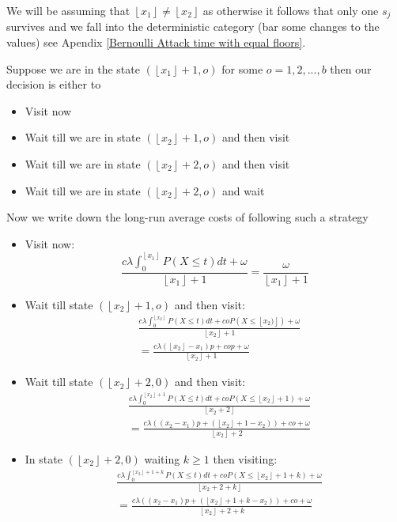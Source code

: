 \documentclass[a4paper,10pt]{article}
\newcommand{\floor}[1]{\left \lfloor #1 \right \rfloor}
\theoremstyle{definition}
\theoremstyle{definition}
\theoremstyle{remark}
\theoremstyle{definition}
\begin{document}
We will be assuming that $\floor{x_{1}} \neq \floor{x_{2}}$ as otherwise it follows that only one $s_{j}$ survives and we fall into the deterministic category (bar some changes to the values) see Apendix \ref{Bernoulli Attack time with equal floors}.

Suppose we are in the state $(\floor{x_{1}}+1,o)$ for some $o=1,2,...,b$ then our decision is either to
\begin{itemize}
\item Visit now
\item Wait till we are in state $(\floor{x_{2}}+1,o)$ and then visit
\item Wait till we are in state $(\floor{x_{2}}+2,o)$ and then visit
\item Wait till we are in state $(\floor{x_{2}}+2,o)$ and wait
\end{itemize}

Now we write down the long-run average costs of following such a strategy
\begin{itemize}
\item Visit now:
\begin{equation}
\frac{c \lambda \int_{0}^{\floor{x_{1}}} P(X \leq t)dt +\omega}{\floor{x_{1}}+1}
=\frac{\omega}{\floor{x_{1}}+1}
\end{equation}
\item Wait till state $(\floor{x_{2}}+1,o)$ and then visit:
\begin{align}
&\frac{c \lambda \int_{0}^{\floor{x_{2}}} P(X \leq t)dt + coP(X \leq \floor{x_{2})})+\omega}{\floor{x_{2}}+1} \nonumber \\&=\frac{c \lambda (\floor{x_{2}}-x_{1})p +cop + \omega}{\floor{x_{2}}+1}
\end{align}


\item Wait till state $(\floor{x_{2}}+2,0)$ and then visit:
\begin{align}
&\frac{c \lambda \int_{0}^{\floor{x_{2}}+1} P(X \leq t)dt +coP(X \leq \floor{x_{2}}+1)+\omega}{\floor{x_{2}+2}} \nonumber \\ &=\frac{c \lambda ((x_{2}-x_{1})p + (\floor{x_{2}}+1-x_{2}))+co+\omega}{\floor{x_{2}}+2}
\end{align}

\item In state $(\floor{x_{2}}+2,0)$ waiting $k \geq 1$ then visiting:
\begin{align}
&\frac{c \lambda \int_{0}^{\floor{x_{2}}+1+k} P(X \leq t)dt +coP(X \leq \floor{x_{2}}+1+k)+\omega}{\floor{x_{2}+2+k}} \nonumber \\ &=\frac{c \lambda ((x_{2}-x_{1})p + (\floor{x_{2}}+1+k-x_{2}))+co+\omega}{\floor{x_{2}}+2+k}
\end{align}

\end{itemize}
\end{document}
